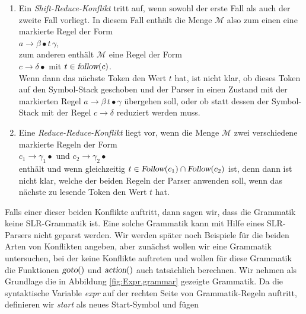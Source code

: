 \begin{enumerate}
\item Ein \textsl{Shift-Reduce-Konflikt} tritt auf, wenn sowohl der erste Fall als auch der zweite Fall
      vorliegt.   In diesem Fall enth\"alt die Menge $\mathcal{M}$ also zum einen eine markierte Regel
      der Form
      \\[0.2cm]
      \hspace*{1.3cm}
      $a \rightarrow \beta \bullet t\, \gamma$,
      \\[0.2cm]
      zum anderen enth\"alt $\mathcal{M}$ eine Regel der Form
      \\[0.2cm]
      \hspace*{1.3cm}
      $c \rightarrow \delta \bullet$ \quad mit $t \in \textsl{follow}(c)$.
      \\[0.2cm]
      Wenn dann das n\"achste Token den Wert $t$ hat, ist nicht klar, ob dieses Token auf den Symbol-Stack 
      geschoben und der Parser in einen Zustand mit der markierten Regel 
      $a \rightarrow \beta\, t \bullet \gamma$ \"ubergehen soll, oder ob statt dessen der Symbol-Stack mit 
      der Regel $c \rightarrow \delta$ reduziert werden muss.
\item Eine \textsl{Reduce-Reduce-Konflikt} liegt vor, wenn die Menge $\mathcal{M}$ zwei verschiedene
      markierte Regeln der Form
      \\[0.2cm]
      \hspace*{1.3cm}
      $c_1 \rightarrow \gamma_1 \bullet$ \quad  und \quad $c_2 \rightarrow \gamma_2 \bullet$
      \\[0.2cm]
      enth\"alt und wenn gleichzeitig $t \in \textsl{Follow}(c_1) \cap \textsl{Follow}(c_2)$ ist,
      denn dann ist nicht klar, welche
      der beiden Regeln der Parser anwenden soll, wenn das n\"achste zu lesende Token den Wert $t$ hat.
\end{enumerate}
Falls einer dieser beiden Konflikte auftritt, dann sagen wir, dass die Grammatik keine
SLR-Grammatik ist.  Eine solche Grammatik kann mit Hilfe eines SLR-Parsers nicht geparst
werden.  Wir werden sp\"ater noch Beispiele f\"ur die beiden Arten von Konflikten angeben, aber
zun\"achst wollen wir eine Grammatik untersuchen, bei der keine Konflikte auftreten und wollen f\"ur
diese Grammatik die Funktionen $\textsl{goto}()$ und $\textsl{action}()$ auch tats\"achlich
berechnen.  Wir nehmen als Grundlage die  in Abbildung
\ref{fig:Expr.grammar} gezeigte Grammatik.
Da die syntaktische Variable \textsl{expr} auf der rechten Seite von
Grammatik-Regeln auftritt, definieren wir \textsl{start} als neues Start-Symbol und f\"ugen
